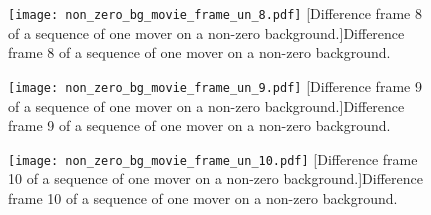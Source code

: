 \begin{figure}[!ht]
	\centering
	\texttt{[image: non\_zero\_bg\_movie\_frame\_un\_8.pdf]}
	[Difference frame 8 of a sequence of one mover on a non-zero background.]{Difference frame 8 of a sequence of one mover on a non-zero background.}
	\label{fig:non_zero_bg_movie_frame_un_8}
\end{figure}

\begin{figure}[!ht]
	\centering
	\texttt{[image: non\_zero\_bg\_movie\_frame\_un\_9.pdf]}
	[Difference frame 9 of a sequence of one mover on a non-zero background.]{Difference frame 9 of a sequence of one mover on a non-zero background.}
	\label{fig:non_zero_bg_movie_frame_un_9}
\end{figure}

\clearpage

\begin{figure}[!ht]
	\centering
	\texttt{[image: non\_zero\_bg\_movie\_frame\_un\_10.pdf]}
	[Difference frame 10 of a sequence of one mover on a non-zero background.]{Difference frame 10 of a sequence of one mover on a non-zero background.}
	\label{fig:non_zero_bg_movie_frame_un_10}
\end{figure}


